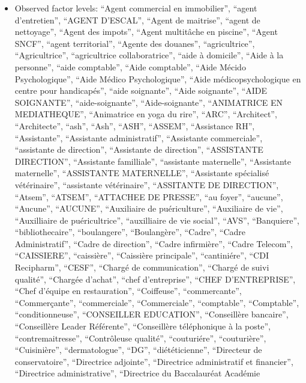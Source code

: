 \documentclass[
  letterpaper,
  DIV=11,
  numbers=noendperiod]{scrartcl}
\providecommand{\tightlist}{%
  \setlength{\itemsep}{0pt}\setlength{\parskip}{0pt}}
\begin{document}
\emini

\begin{itemize}
\tightlist
\item
  Observed factor levels: ``Agent commercial en immobilier'', ``agent
  d'entretien'', ``AGENT D'ESCAL'', ``Agent de maitrise'', ``agent de
  nettoyage'', ``Agent des impots'', ``Agent multitâche en piscine'',
  ``Agent SNCF'', ``agent territorial'', ``Agente des douanes'',
  ``agricultrice'', ``Agricultrice'', ``agricultrice collaboratrice'',
  ``aide à domicile'', ``Aide à la personne'', ``aide comptable'',
  ``Aide comptable'', ``Aide Mécido Psychologique'', ``Aide Médico
  Psychologique'', ``Aide médicopsychologique en centre pour
  handicapés'', ``aide soignante'', ``Aide soignante'', ``AIDE
  SOIGNANTE'', ``aide-soignante'', ``Aide-soignante'', ``ANIMATRICE EN
  MEDIATHEQUE'', ``Animatrice en yoga du rire'', ``ARC'', ``Architect'',
  ``Architecte'', ``ash'', ``Ash'', ``ASH'', ``ASSEM'', ``Assistance
  RH'', ``Assistante'', ``Assistante administratif'', ``Assistante
  commerciale'', ``assistante de direction'', ``Assistante de
  direction'', ``ASSISTANTE DIRECTION'', ``Assistante familliale'',
  ``assistante maternelle'', ``Assistante maternelle'', ``ASSISTANTE
  MATERNELLE'', ``Assistante spécialisé vétérinaire'', ``assistante
  vétérinaire'', ``ASSITANTE DE DIRECTION'', ``Atsem'', ``ATSEM'',
  ``ATTACHEE DE PRESSE'', ``au foyer'', ``aucune'', ``Aucune'',
  ``AUCUNE'', ``Auxiliaire de puériculture'', ``Auxiliaire de vie'',
  ``Auxilliaire de puéricultrice'', ``auxilliaire de vie social'',
  ``AVS'', ``Banquiere'', ``bibliothecaire'', ``boulangere'',
  ``Boulangère'', ``Cadre'', ``Cadre Administratif'', ``Cadre de
  direction'', ``Cadre infirmière'', ``Cadre Telecom'', ``CAISSIERE'',
  ``caissière'', ``Caissière principale'', ``cantiniére'', ``CDI
  Recipharm'', ``CESF'', ``Chargé de communication'', ``Chargé de suivi
  qualité'', ``Chargée d'achat'', ``chef d'entreprise'', ``CHEF
  D'ENTREPRISE'', ``Chef d'équipe en restauration'', ``Coiffeuse'',
  ``commercante'', ``Commerçante'', ``commerciale'', ``Commerciale'',
  ``comptable'', ``Comptable'', ``conditionneuse'', ``CONSEILLER
  EDUCATION'', ``Conseillère bancaire'', ``Conseillère Leader
  Référente'', ``Conseillère téléphonique à la poste'',
  ``contremaitresse'', ``Contrôleuse qualité'', ``couturiére'',
  ``couturière'', ``Cuisinière'', ``dermatologue'', ``DG'',
  ``diététicienne'', ``Directeur de conservatoire'', ``Directrice
  adjointe'', ``Directrice administratif et financier'', ``Directrice
  administrative'', ``Directrice du Baccalauréat Académie

\end{itemize}
\end{document}
